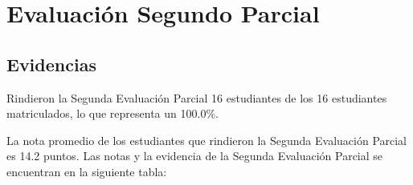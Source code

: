 \chapter{Evaluación Segundo Parcial}
\newpage





\pagestyle{empty} %

\section{Evidencias}
Rindieron la Segunda Evaluación Parcial 16 estudiantes de los 16 estudiantes matriculados, lo que representa un 100.0\%.

La nota promedio de los estudiantes que rindieron la Segunda Evaluación Parcial es 14.2 puntos. Las notas y la evidencia de la Segunda Evaluación Parcial se encuentran en la siguiente tabla:


